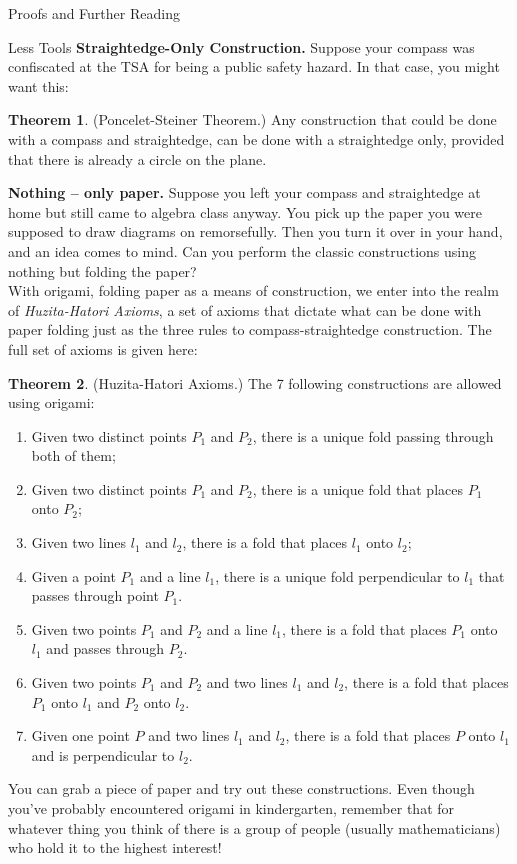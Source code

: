 \documentclass[12pt]{article}
\theoremstyle{definition}
\theoremstyle{definition}
\theoremstyle{definition}
\newtheorem{theorem}{Theorem}[section]
\theoremstyle{definition}
\theoremstyle{definition}
\theoremstyle{definition}
\theoremstyle{definition}
\begin{document}
\begin{section}{Proofs and Further Reading}
\begin{subsection}{Less Tools}
        \break
        \noindent\textbf{Straightedge-Only Construction.} Suppose your compass was confiscated at the TSA for being a public safety hazard. In that case, you might want this:
        \begin{theorem}{(Poncelet-Steiner Theorem.)}
            Any construction that could be done with a compass and straightedge, can be done with a straightedge only, provided that there is already a circle on the plane.
        \end{theorem}
        \noindent\textbf{Nothing -- only paper.} Suppose you left your compass and straightedge at home but still came to algebra class anyway. You pick up the paper you were supposed to 
        draw diagrams on remorsefully. Then you turn it over in your hand, and an idea comes to mind. Can you perform the classic constructions using nothing but folding 
        the paper?\\
        \break
        With origami, folding paper as a means of construction, we enter into the realm of \textit{Huzita-Hatori Axioms}, a set of axioms that dictate what can be done with paper folding just 
        as the three rules to compass-straightedge construction. The full set of axioms is given here:
        \begin{theorem}{(Huzita-Hatori Axioms.)}
            The 7 following constructions are allowed using origami:
            \begin{enumerate}
                \item Given two distinct points \(P_1\) and \(P_2\), there is a unique fold passing through both of them;
                \item Given two distinct points \(P_1\) and \(P_2\), there is a unique fold that places \(P_1\) onto \(P_2\);
                \item Given two lines \(l_1\) and \(l_2\), there is a fold that places \(l_1\) onto \(l_2\);
                \item Given a point \(P_1\) and a line \(l_1\), there is a unique fold perpendicular to \(l_1\) that passes through point \(P_1\).
                \item Given two points \(P_1\) and \(P_2\) and a line \(l_1\), there is a fold that places \(P_1\) onto \(l_1\) and passes through \(P_2\).
                \item Given two points \(P_1\) and \(P_2\) and two lines \(l_1\) and \(l_2\), there is a fold that places \(P_1\) onto \(l_1\) and \(P_2\) onto \(l_2\).
                \item Given one point \(P\) and two lines \(l_1\) and \(l_2\), there is a fold that places \(P\) onto \(l_1\) and is perpendicular to \(l_2\).
            \end{enumerate}
        \end{theorem}
        You can grab a piece of paper and try out these constructions. Even though you've probably encountered origami in kindergarten, remember that for whatever thing you think of there is a group 
        of people (usually mathematicians) who hold it to the highest interest!
    \end{subsection}


\end{section}
\end{document}
